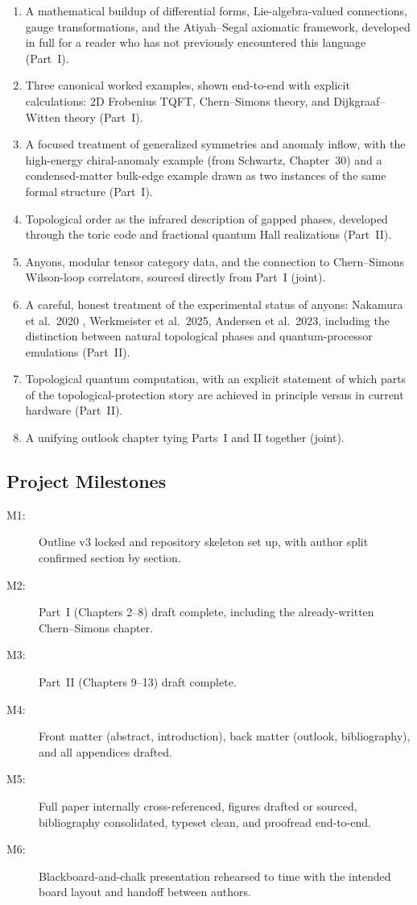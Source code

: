 \documentclass[11pt]{article}
\begin{document}
\begin{enumerate}[label=(\roman*)]
\item A mathematical buildup of differential forms, Lie-algebra-valued connections, gauge
transformations, and the Atiyah--Segal axiomatic framework, developed in full for a
reader who has not previously encountered this language (Part~I).
\item Three canonical worked examples, shown end-to-end with explicit calculations:
2D Frobenius TQFT, Chern--Simons theory, and Dijkgraaf--Witten theory (Part~I).
\item A focused treatment of generalized symmetries and anomaly inflow, with the high-energy
chiral-anomaly example (from Schwartz, Chapter~30) and a condensed-matter bulk-edge
example drawn as two instances of the same formal structure (Part~I).
\item Topological order as the infrared description of gapped phases, developed
through the toric code and fractional quantum Hall realizations (Part~II).
\item Anyons, modular tensor category data, and the connection to Chern--Simons
Wilson-loop correlators, sourced directly from Part~I (joint).
\item A careful, honest treatment of the experimental status of anyons: Nakamura et al.\
2020 \cite{Nakamura2020}, Werkmeister et al.\ 2025, Andersen et al.\ 2023, including
the distinction between natural topological phases and quantum-processor emulations
(Part~II).
\item Topological quantum computation, with an explicit statement of which parts of the
topological-protection story are achieved in principle versus in current hardware (Part~II).
\item A unifying outlook chapter tying Parts~I and II together (joint).
\end{enumerate}

\subsection{Project Milestones}

\begin{description}
\item[M1:] Outline v3 locked and repository skeleton set up, with author split confirmed
section by section.
\item[M2:] Part~I (Chapters 2--8) draft complete, including the already-written
Chern--Simons chapter.
\item[M3:] Part~II (Chapters 9--13) draft complete.
\item[M4:] Front matter (abstract, introduction), back matter (outlook, bibliography),
and all appendices drafted.
\item[M5:] Full paper internally cross-referenced, figures drafted or sourced, bibliography
consolidated, typeset clean, and proofread end-to-end.
\item[M6:] Blackboard-and-chalk presentation rehearsed to time with the intended board
layout and handoff between authors.
\end{description}
\end{document}
